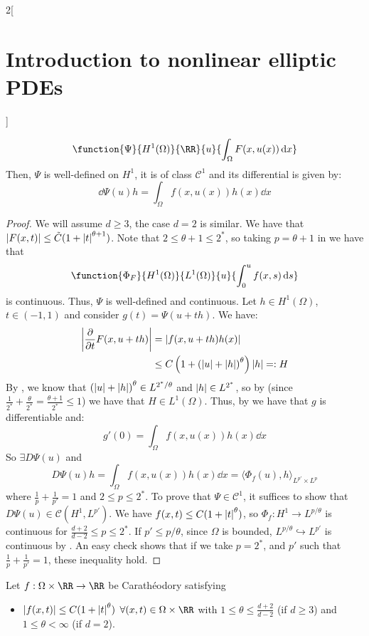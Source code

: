 \documentclass[../../../main_math.tex]{subfiles}
\begin{document}
\begin{multicols}{2}[\section{Introduction to nonlinear elliptic PDEs}]
\begin{proposition}
    $$
      \function{\Psi}{H^1(\Omega)}{\RR}{u}{\displaystyle\int_\Omega F(x,u(x))\dd{x}}
    $$
    Then, $\Psi$ is well-defined on $H^1$, it is of class $\mathcal{C}^1$ and its differential is given by:
    $$
      \dd{\Psi(u)}h=\int_\Omega f(x,u(x))h(x)\dd{x}
    $$
  \end{proposition}
  \begin{proof}
    We will assume $d\geq 3$, the case $d=2$ is similar. We have that $\abs{F(x,t)}\leq \tilde{C}(1+\abs{t}^{\theta+1})$. Note that $2\leq \theta+1\leq 2^*$, so taking $p=\theta+1$ in  we have that
    $$
      \function{\Phi_F}{H^1(\Omega)}{L^{1}(\Omega)}{u}{\int_0^{u}f(x,s)\dd{s}}
    $$
    is continuous. Thus, $\Psi$ is well-defined and continuous. Let $h\in H^1(\Omega)$, $t\in (-1,1)$ and consider $g(t)=\Psi(u+th)$. We have:
    \begin{align*}
      \abs{\pdv{}{t}F(x,u+th)} & =\abs{f(x,u+th)h(x)}                                      \\
                               & \leq C\left(1+{(\abs{u}+\abs{h})}^\theta\right)\abs{h}=:H
    \end{align*}
    By , we know that ${(\abs{u}+\abs{h})}^\theta\in L^{2^*/\theta}$ and $\abs{h}\in L^{2^*}$, so by  (since $\frac{1}{2^*}+\frac{\theta}{2^*}=\frac{\theta+1}{2^*}\leq 1$) we have that $H\in L^1(\Omega)$. Thus, by  we have that $g$ is differentiable and:
    $$
      g'(0)=\int_\Omega f(x,u(x))h(x)\dd{x}
    $$
    So $\exists D\Psi(u)$ and $$
      D\Psi(u)h=\int_\Omega f(x,u(x))h(x)\dd{x}={\langle \Phi_f(u), h\rangle}_{L^{p'}\times L^p}
    $$
    where $\frac{1}{p}+\frac{1}{p'}=1$ and $2\leq p\leq 2^*$. To prove that $\Psi\in\mathcal{C}^1$, it suffices to show that $D\Psi(u)\in \mathcal{C}(H^1,L^{p'})$. We have $f(x,t)\leq C(1+\abs{t}^\theta)$, so $\Phi_f:H^1\to L^{p/\theta}$ is continuous for $\frac{d+2}{d-2}\leq p\leq 2^*$. If $p'\leq p/\theta$, since $\Omega$ is bounded, $L^{p/\theta}\hookrightarrow L^{p'}$ is continuous by . An easy check shows that if we take $p=2^*$, and $p'$ such that $\frac{1}{p}+\frac{1}{p'}=1$, these inequality hold.
  \end{proof}
  \begin{theorem}
    Let $f:\Omega\times \RR\to\RR$ be Carathéodory satisfying
    \begin{itemize}
      \item $\abs{f(x,t)}\leq C(1+\abs{t}^\theta)$ $\forall (x,t)\in \Omega\times \RR$ with $1\leq \theta\leq \frac{d+2}{d-2}$ (if $d\geq 3$) and $1\leq \theta<\infty$ (if $d=2$).

\end{itemize}
\end{theorem}
\end{multicols}
\end{document}
